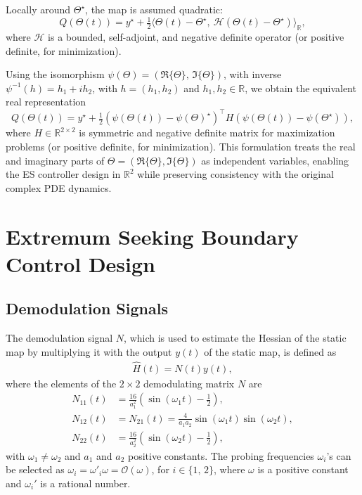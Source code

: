 \documentclass[letterpaper, 10 pt, conference]{ieeeconf}  %
\begin{document}
Locally around \( \Theta^{\star} \), the map is assumed quadratic:
\begin{equation}
Q(\Theta(t)) = y^\star + \tfrac{1}{2}\langle \Theta(t) - \Theta^\star,\ \mathcal{H}(\Theta(t) - \Theta^\star) \rangle_{\mathbb{R}},
\end{equation}
where \( \mathcal{H} \) is a bounded, self-adjoint, and negative definite operator (or positive definite, for minimization).  

Using the isomorphism \( \psi(\Theta) = (\Re\{\Theta\},\,\Im\{\Theta\}) \), with inverse $\psi^{-1}(h)=h_{1}+ih_{2}$, with $h=(h_{1},h_{2})$ and $h_{1},h_{2}\in\mathbb{R}$,  we obtain the equivalent real representation
\begin{equation}
Q(\Theta(t)) = y^\star + \tfrac{1}{2}(\psi(\Theta(t)) - \psi(\Theta)^\star)^\top H(\psi(\Theta(t)) - \psi(\Theta^\star)), 
\label{extrachapter.eq:static_map}
\end{equation}
where \( H \in \mathbb{R}^{2\times 2} \) is symmetric and negative definite matrix for maximization problems (or positive definite, for minimization).  
This formulation treats the real and imaginary parts of \( \Theta = (\Re\{\Theta\},\Im\{\Theta\}) \) as independent variables, enabling the ES controller design in \( \mathbb{R}^2 \) while preserving consistency with the original complex PDE dynamics.






\section{Extremum Seeking Boundary Control Design} \label{section:extremum_seeking_design}
\subsection{Demodulation Signals}

The demodulation signal $N$, which is used to estimate the Hessian of the static map by multiplying it with the output $y(t)$ of the static map, is defined as
\begin{align}
\hat{H}(t) = N(t)y(t),
    \label{eq:hessian}
\end{align}
\noindent where the elements of the $2\times 2$ demodulating matrix $N$ are
\begin{align*}
    N_{11}(t) &= \frac{16}{a_{1}^2}\left( \sin (\omega_{1} t) - \frac{1}{2} \right),\\
    N_{12}(t) &= N_{21}(t) = \frac{4}{a_{1}a_{2}} \sin (\omega_{1} t) \sin (\omega_{2} t),\\
    N_{22}(t) &= \frac{16}{a_{2}^2}\left( \sin (\omega_{2} t) - \frac{1}{2} \right),
\end{align*}
\noindent with $\omega_{1} \neq \omega_{2}$ and $a_1$ and $a_2$ positive constants. The probing frequencies $\omega_{i}$'s can be selected as $\omega_{i}=\omega'_{i}\omega=\mathcal{O}(\omega)$, for $i\in\{1,\,2\}$, where $\omega$ is a positive constant and $\omega_{i}'$ is a rational number. 
\end{document}

